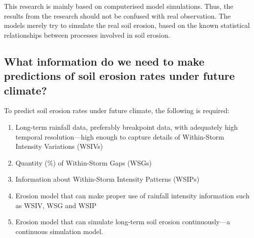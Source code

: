 This research is mainly based on computerised model simulations. Thus, the
results from the research should not be confused with real observation. The
models merely try to simulate the real soil erosion, based on the known
statistical relationships between processes involved in soil erosion.

\subsection{What information do we need to make predictions of soil erosion
rates under future climate?}
\label{sec:WeNeedToPredictErosionUnderFutureChangedRainfallIntensities}
To predict soil erosion rates under future climate, the following is required:
\begin{enumerate}
  \item Long-term rainfall data, preferably breakpoint data, with adequately
high temporal resolution---high enough to capture details of Within-Storm
Intensity Variations (WSIVs)
  \item Quantity (\%) of Within-Storm Gaps (WSGs)
  \item Information about Within-Storm Intensity Patterns (WSIPs)
  \item Erosion model that can make proper use of rainfall intensity
information such as WSIV, WSG and WSIP
  \item Erosion model that can simulate long-term soil erosion continuously---a
continuous simulation model.
\end{enumerate}

